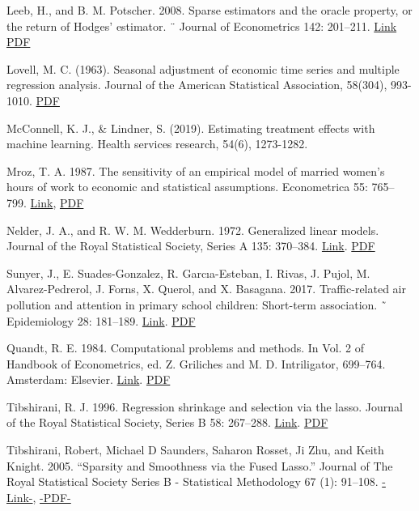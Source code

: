 {Leeb, H., and B. M. Potscher. 2008. Sparse estimators and the oracle property, or the return of Hodges’ estimator. ¨
Journal of Econometrics 142: 201–211. \href{https://doi.org/10.1016/j.jeconom.2007.05.017}{Link} \href{http://sci-hub.ren/10.1016/j.jeconom.2007.05.017}{PDF}

Lovell, M. C. (1963). Seasonal adjustment of economic time series and multiple regression analysis. Journal of the American Statistical Association, 58(304), 993-1010. \href{http://sci-hub.ren/10.1080/01621459.1963.10480682}{PDF}

McConnell, K. J., \& Lindner, S. (2019). Estimating treatment effects with machine learning. Health services research, 54(6), 1273-1282.

Mroz, T. A. 1987. The sensitivity of an empirical model of married women’s hours of work to economic and statistical
assumptions. Econometrica 55: 765–799. \href{https://doi.org/10.2307/1911029}{Link}, \href{http://sci-hub.ren/10.2307/1911029}{PDF}


Nelder, J. A., and R. W. M. Wedderburn. 1972. Generalized linear models. Journal of the Royal Statistical Society,
Series A 135: 370–384. \href{https://doi.org/10.2307/2344614}{Link}. \href{http://sci-hub.ren/10.2307/2344614}{PDF}

Sunyer, J., E. Suades-Gonzalez, R. Garcıa-Esteban, I. Rivas, J. Pujol, M. Alvarez-Pedrerol, J. Forns, X. Querol, and
X. Basagana. 2017. Traffic-related air pollution and attention in primary school children: Short-term association. ˜
Epidemiology 28: 181–189. \href{https://doi.org/10.1097/EDE.0000000000000603}{Link}.
\href{http://sci-hub.ren/10.1097/EDE.0000000000000603}{PDF}

Quandt, R. E. 1984. Computational problems and methods. In Vol. 2 of Handbook of Econometrics, ed. Z. Griliches
and M. D. Intriligator, 699–764. Amsterdam: Elsevier. \href{https://doi.org/10.1016/S1573-4412(83)01016-8}{Link}. \href{http://sci-hub.ren/10.1016/S1573-4412(83)01016-8}{PDF}

Tibshirani, R. J. 1996. Regression shrinkage and selection via the lasso. Journal of the Royal Statistical Society,
Series B 58: 267–288. \href{https://doi.org/10.1111/j.2517-6161.1996.tb02080.x}{Link}. \href{http://sci-hub.ren/10.1111/j.2517-6161.1996.tb02080.x}{PDF}

Tibshirani, Robert, Michael D Saunders, Saharon Rosset, Ji Zhu, and Keith Knight. 2005. “Sparsity and Smoothness via the Fused Lasso.” Journal of The Royal Statistical Society Series B - Statistical Methodology 67 (1): 91–108. \href{https://doi.org/10.1111/J.1467-9868.2005.00490.X}{-Link-}, \href{http://sci-hub.ren/10.1111/J.1467-9868.2005.00490.X}{-PDF-}

}
